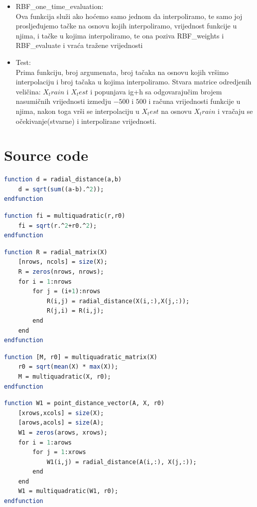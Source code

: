 \documentclass[12pt, a4paper]{report}
\theoremstyle{definition}
\begin{document}
\begin{itemize}
		\item RBF\_one\_time\_evaluation:\\
		Ova funkcija služi ako hoćemo samo jednom da interpoliramo, te samo joj prosljeđujemo tačke na osnovu kojih interpoliramo, vrijednost funkcije u njima, i tačke u kojima interpoliramo, te ona poziva RBF\_weights i RBF\_evaluate i vraća tražene vrijednosti
		
		\item Test:\\
		Prima funkciju, broj argumenata, broj tačaka na osnovu kojih vršimo interpolaciju i broj tačaka u kojima interpoliramo. Stvara matrice odredjenih veličina: $X_train$ i $X_test$ i popunjava ig+h sa odgovarajučim brojem nasumičnih vrijednosti izmedju $-500$ i $500$ i računa vrijednosti funkcije u njima, nakon toga vrši se interpolaciju u $X_test$ na osnovu $X_train$ i vračaju se očekivanje(stvarne) i interpolirane vrijednosti.
		
	\end{itemize}
	
	
	\section*{Source code}

\begin{lstlisting}[language=Scilab]
function d = radial_distance(a,b)
    d = sqrt(sum((a-b).^2));
endfunction	
\end{lstlisting}

\begin{lstlisting}[language=Scilab]
function fi = multiquadratic(r,r0)
    fi = sqrt(r.^2+r0.^2);
endfunction
\end{lstlisting}

\begin{lstlisting}[language=Scilab]
function R = radial_matrix(X)
    [nrows, ncols] = size(X);
    R = zeros(nrows, nrows);
    for i = 1:nrows
        for j = (i+1):nrows
            R(i,j) = radial_distance(X(i,:),X(j,:));
            R(j,i) = R(i,j);
        end
    end
endfunction

\end{lstlisting}

\begin{lstlisting}[language=Scilab]
function [M, r0] = multiquadratic_matrix(X)
    r0 = sqrt(mean(X) * max(X));
    M = multiquadratic(X, r0);
endfunction
\end{lstlisting}

\begin{lstlisting}[language=Scilab]
function W1 = point_distance_vector(A, X, r0)
    [xrows,xcols] = size(X);
    [arows,acols] = size(A);
    W1 = zeros(arows, xrows);
    for i = 1:arows
        for j = 1:xrows
            W1(i,j) = radial_distance(A(i,:), X(j,:));
        end
    end
    W1 = multiquadratic(W1, r0);
endfunction
\end{lstlisting}
\end{document}
